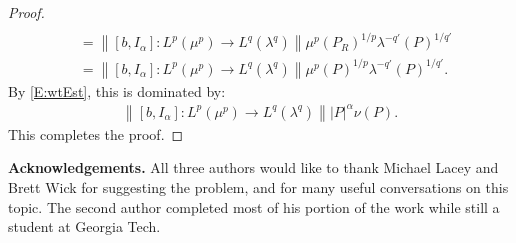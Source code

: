 \documentclass[12pt]{amsart}
\begin{document}
\begin{proof}
\begin{align*}
\\&={\ensuremath{\left\|{[b,I_\alpha]:L^p(\mu^p)\to L^q(\lambda^q)}\right\|}}
  \mu^{p}(P_R)^{1/p}\lambda^{-q'}(P)^{1/q'}
\\&={\ensuremath{\left\|{[b,I_\alpha]:L^p(\mu^p)\to L^q(\lambda^q)}\right\|}}
  \mu^{p}(P)^{1/p}\lambda^{-q'}(P)^{1/q'}.
\end{align*}
By \eqref{E:wtEst}, this is dominated by:
\begin{align*}
{\ensuremath{\left\|{[b,I_\alpha]:L^p(\mu^p)\to L^q(\lambda^q)}\right\|}}
  {\ensuremath{\left\vert{P}\right\vert}}^{\alpha}\nu(P).
\end{align*}
This completes the proof.
\end{proof}

\noindent \textbf{Acknowledgements.} All three authors would like to thank 
Michael Lacey and Brett Wick for suggesting the problem, and for many useful 
conversations on this topic.  The second author completed most of his 
portion of the work while still a student at Georgia Tech.
\end{document}
